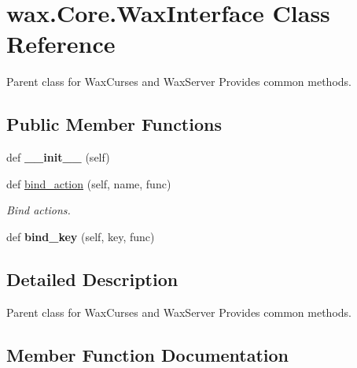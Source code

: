 \hypertarget{classwax_1_1Core_1_1WaxInterface}{}\section{wax.\+Core.\+Wax\+Interface Class Reference}
\label{classwax_1_1Core_1_1WaxInterface}


Parent class for Wax\+Curses and Wax\+Server Provides common methods.  


\subsection*{Public Member Functions}
\begin{DoxyCompactItemize}
\item 
def {\bfseries \+\_\+\+\_\+init\+\_\+\+\_\+} (self)\hypertarget{classwax_1_1Core_1_1WaxInterface_a9494be173be6e980524d2e2527583f0b}{}\label{classwax_1_1Core_1_1WaxInterface_a9494be173be6e980524d2e2527583f0b}

\item 
def \hyperlink{classwax_1_1Core_1_1WaxInterface_af10d87f79dc119f4d5f30cd70ef9feb9}{bind\+\_\+action} (self, name, func)
\begin{DoxyCompactList}\small\item\em Bind actions. \end{DoxyCompactList}\item 
def {\bfseries bind\+\_\+key} (self, key, func)\hypertarget{classwax_1_1Core_1_1WaxInterface_a58dd4d72ef0a9123e85ea22f90e48797}{}\label{classwax_1_1Core_1_1WaxInterface_a58dd4d72ef0a9123e85ea22f90e48797}

\end{DoxyCompactItemize}


\subsection{Detailed Description}
Parent class for Wax\+Curses and Wax\+Server Provides common methods. 

\subsection{Member Function Documentation}
